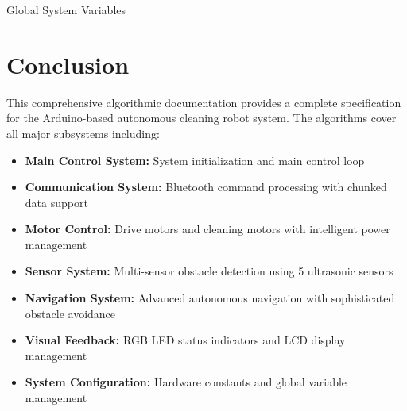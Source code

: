 \documentclass[12pt]{article}
\begin{document}
\begin{algorithm}[H]
\SetAlgoLined
\DontPrintSemicolon
\caption{Global System Variables}
\end{algorithm}

\section{Conclusion}

This comprehensive algorithmic documentation provides a complete specification for the Arduino-based autonomous cleaning robot system. The algorithms cover all major subsystems including:

\begin{itemize}
    \item \textbf{Main Control System:} System initialization and main control loop
    \item \textbf{Communication System:} Bluetooth command processing with chunked data support
    \item \textbf{Motor Control:} Drive motors and cleaning motors with intelligent power management
    \item \textbf{Sensor System:} Multi-sensor obstacle detection using 5 ultrasonic sensors
    \item \textbf{Navigation System:} Advanced autonomous navigation with sophisticated obstacle avoidance
    \item \textbf{Visual Feedback:} RGB LED status indicators and LCD display management
    \item \textbf{System Configuration:} Hardware constants and global variable management
\end{itemize}
\end{document}
